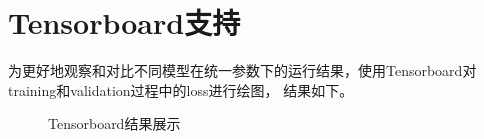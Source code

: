 \documentclass[]{ctexart}
\begin{document}
\section{Tensorboard支持}
为更好地观察和对比不同模型在统一参数下的运行结果，使用Tensorboard对training和validation过程中的loss进行绘图，
结果如下。
\begin{figure}[htbp]
  \centering
  \caption{Tensorboard结果展示}
  \label{dim1}
\end{figure}
\end{document}
